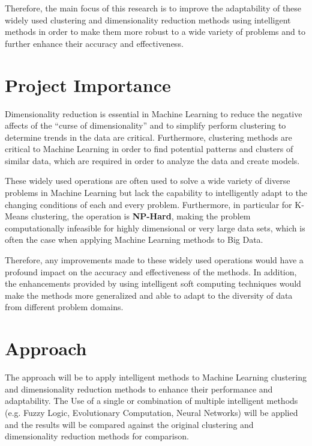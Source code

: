 \documentclass{article}
\newcommand{\bold}[1]{\textbf{#1}}
\begin{document}
Therefore, the main focus of this research is to improve the adaptability of these widely used clustering and dimensionality reduction methods using intelligent methods in order to make them more robust to a wide variety of problems and to further enhance their accuracy and effectiveness.




\section{Project Importance}

Dimensionality reduction is essential in Machine Learning to reduce the negative affects of the ``curse of dimensionality'' and to simplify perform clustering to determine trends in the data are critical. Furthermore, clustering methods are critical to Machine Learning in order to find potential patterns and clusters of similar data, which are required in order to analyze the data and create models.

These widely used operations are often used to solve a wide variety of diverse problems in Machine Learning but lack the capability to intelligently adapt to the changing conditions of each and every problem. Furthermore, in particular for K-Means clustering, the operation is \bold{NP-Hard}\cite{jain2010}, making the problem computationally infeasible for highly dimensional or very large data sets, which is often the case when applying Machine Learning methods to Big Data.

Therefore, any improvements made to these widely used operations would have a profound impact on the accuracy and effectiveness of the methods. In addition, the enhancements provided by using intelligent soft computing techniques would make the methods more generalized and able to adapt to the diversity of data from different problem domains.




\section{Approach}

The approach will be to apply intelligent methods to Machine Learning clustering and dimensionality reduction methods to enhance their performance and adaptability. The Use of a single or combination of multiple intelligent methods (e.g. Fuzzy Logic, Evolutionary Computation, Neural Networks) will be applied and the results will be compared against the original clustering and dimensionality reduction methods for comparison.
\end{document}
